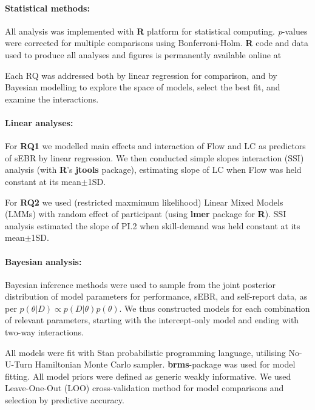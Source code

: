 \documentclass[10pt,letterpaper,floatsintext]{article}
\begin{document}
\paragraph{Statistical methods:}
All analysis was implemented with {\bf R} platform for statistical computing. {\it p}-values were corrected for multiple comparisons using Bonferroni-Holm. {\bf R} code and data used to produce all analyses and figures is permanently available online at 

Each RQ was addressed both by linear regression for comparison, and by Bayesian modelling to explore the space of models, select the best fit, and examine the interactions. 

\paragraph{Linear analyses:}
For {\bf RQ1} we modelled main effects and interaction of Flow and LC as predictors of sEBR by linear regression. We then conducted simple slopes interaction (SSI) analysis (with {\bf R}'s {\bf jtools} package), estimating slope of LC when Flow was held constant at its mean$\pm$1SD. 

For \textbf{RQ2} we used (restricted maxmimum likelihood) Linear Mixed Models (LMMs) with random effect of participant (using {\bf lmer} package for {\bf R}). SSI analysis estimated the slope of PI.2 when skill-demand was held constant at its mean$\pm$1SD.

\paragraph{Bayesian analysis:}
Bayesian inference methods were used to sample from the joint posterior distribution of model parameters for performance, sEBR, and self-report data, as per $p(\theta|D) \propto p(D|\theta)p(\theta)$. We thus constructed models for each combination of relevant parameters, starting with the intercept-only model and ending with two-way interactions.  


All models were fit with Stan probabilistic programming language, utilising No-U-Turn Hamiltonian Monte Carlo sampler. {\bf brms}-package was used for model fitting. All model priors were defined as generic weakly informative. We used Leave-One-Out (LOO) cross-validation method for model comparisons and selection by predictive accuracy.
\end{document}
